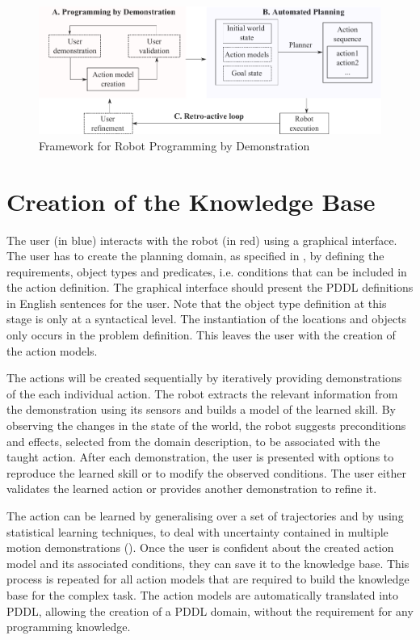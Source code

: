   \begin{figure}[!h]
    \centering
    \includegraphics[width=\linewidth]{figures/framework}
    \caption{Framework for Robot Programming by Demonstration}
    \label{fig:framework}
  \end{figure}

\section{Creation of the Knowledge Base}
The user (in blue) interacts with the robot (in red) using a graphical interface.
The user has to create the planning domain, as specified in , by defining the requirements, object types and predicates, i.e. conditions that can be included in the action definition.
The graphical interface should present the PDDL definitions in English sentences for the user.
Note that the object type definition at this stage is only at a syntactical level.
The instantiation of the locations and objects only occurs in the problem definition.
This leaves the user with the creation of the action models.

The actions will be created sequentially by iteratively providing demonstrations of the each individual action.
The robot extracts the relevant information from the demonstration using its sensors and builds a model of the learned skill.
By observing the changes in the state of the world, the robot suggests preconditions and effects, selected from the domain description, to be associated with the taught action.
After each demonstration, the user is presented with options to reproduce the learned skill or to modify the observed conditions.
The user either validates the learned action or provides another demonstration to refine it.
 

The action can be learned by generalising over a set of trajectories and by using statistical learning techniques, to deal with uncertainty contained in multiple motion demonstrations (\cite{ude1993trajectory}).
Once the user is confident about the created action model and its associated conditions, they can save it to the knowledge base.
 This process is repeated for all action models that are required to build the knowledge base for the complex task.
 The action models are automatically translated into PDDL, allowing the creation of a PDDL domain, without the requirement for any programming knowledge.

